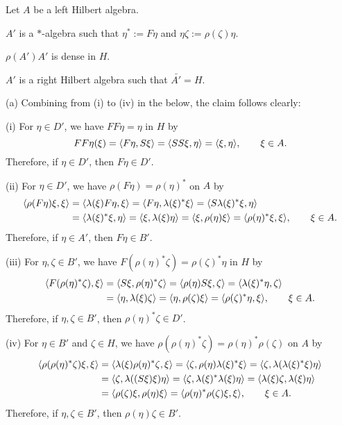 \documentclass{../../../small}
\begin{document}
\begin{prop}
Let $A$ be a left Hilbert algebra.
\begin{parts}
\item $A'$ is a $*$-algebra such that $\eta^*:=F\eta$ and $\eta\zeta:=\rho(\zeta)\eta$.
\item $\rho(A')A'$ is dense in $H$.
\item $A'$ is a right Hilbert algebra such that $\bar{A'}=H$.
\end{parts}
\end{prop}
\begin{pf}
(a)
Combining from (i) to (iv) in the below, the claim follows clearly:

(i)
For $\eta\in D'$, we have $FF\eta=\eta$ in $H$ by
\[FF\eta(\xi)=\langle F\eta,S\xi\rangle=\langle SS\xi,\eta\rangle=\langle\xi,\eta\rangle,\qquad\xi\in A.\]
Therefore, if $\eta\in D'$, then $F\eta\in D'$.

(ii)
For $\eta\in D'$, we have $\rho(F\eta)=\rho(\eta)^*$ on $A$ by
\begin{align*}
\langle\rho(F\eta)\xi,\xi\rangle
&=\langle\lambda(\xi)F\eta,\xi\rangle
=\langle F\eta,\lambda(\xi)^*\xi\rangle
=\langle S\lambda(\xi)^*\xi,\eta\rangle\\
&=\langle\lambda(\xi)^*\xi,\eta\rangle
=\langle\xi,\lambda(\xi)\eta\rangle
=\langle\xi,\rho(\eta)\xi\rangle
=\langle\rho(\eta)^*\xi,\xi\rangle
,\qquad\xi\in A.
\end{align*}
Therefore, if $\eta\in A'$, then $F\eta\in B'$.

(iii)
For $\eta,\zeta\in B'$, we have $F(\rho(\eta)^*\zeta)=\rho(\zeta)^*\eta$ in $H$ by
\begin{align*}
\langle F(\rho(\eta)^*\zeta),\xi\rangle
&=\langle S\xi,\rho(\eta)^*\zeta\rangle
=\langle\rho(\eta)S\xi,\zeta\rangle
=\langle\lambda(\xi)^*\eta,\zeta\rangle\\
&=\langle\eta,\lambda(\xi)\zeta\rangle
=\langle\eta,\rho(\zeta)\xi\rangle
=\langle\rho(\zeta)^*\eta,\xi\rangle
,\qquad\xi\in A.
\end{align*}
Therefore, if $\eta,\zeta\in B'$, then $\rho(\eta)^*\zeta\in D'$.

(iv)
For $\eta\in B'$ and $\zeta\in H$, we have $\rho(\rho(\eta)^*\zeta)=\rho(\eta)^*\rho(\zeta)$ on $A$ by
\begin{align*}
\langle\rho(\rho(\eta)^*\zeta)\xi,\xi\rangle
&=\langle\lambda(\xi)\rho(\eta)^*\zeta,\xi\rangle
=\langle\zeta,\rho(\eta)\lambda(\xi)^*\xi\rangle
=\langle\zeta,\lambda(\lambda(\xi)^*\xi)\eta\rangle\\
&=\langle\zeta,\lambda((S\xi)\xi)\eta\rangle
=\langle\zeta,\lambda(\xi)^*\lambda(\xi)\eta\rangle
=\langle\lambda(\xi)\zeta,\lambda(\xi)\eta\rangle\\
&=\langle\rho(\zeta)\xi,\rho(\eta)\xi\rangle
=\langle\rho(\eta)^*\rho(\zeta)\xi,\xi\rangle
,\qquad\xi\in A.
\end{align*}
Therefore, if $\eta,\zeta\in B'$, then $\rho(\eta)\zeta\in B'$.



\end{pf}
\end{document}
